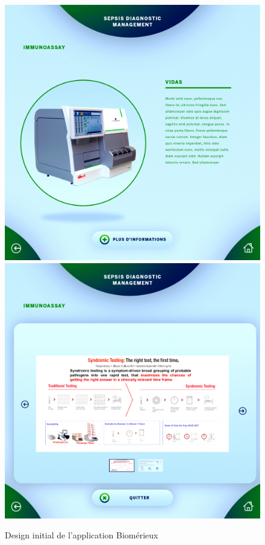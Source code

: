 \documentclass{article}
\begin{document}
\begin{figure}[h]
    \includegraphics[scale=0.095]{bmx-3-initial.jpg}
    \includegraphics[scale=0.095]{bmx-4-initial.jpg}
    \caption{Design initial de l'application Biomérieux}
\end{figure}
\end{document}
